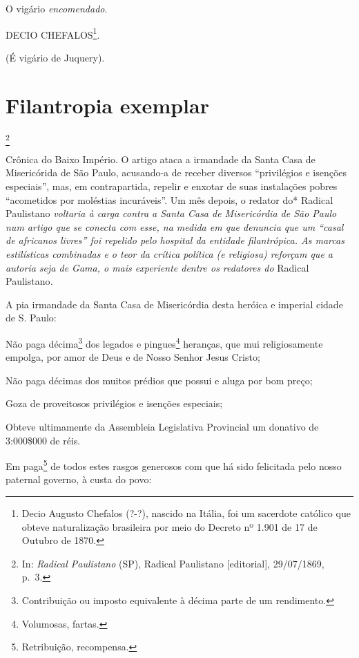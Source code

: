 O vigário \emph{encomendado}.

DECIO CHEFALOS\footnote{Decio Augusto Chefalos (?-?), nascido na
  Itália, foi um sacerdote católico que obteve naturalização brasileira
  por meio do Decreto nº 1.901 de 17 de Outubro de 1870.}.

(É vigário de Juquery).

\chapter{Filantropia exemplar}\footnote{In: \emph{Radical Paulistano} (SP),
  Radical Paulistano {[}editorial{]}, 29/07/1869, p.~3.}

\begin{didascalia}
Crônica do Baixo Império. O artigo ataca a irmandade da Santa Casa de
Misericórida de São Paulo, acusando-a de receber diversos ``privilégios e
isenções especiais'', mas, em contrapartida, repelir e enxotar de suas
instalações pobres ``acometidos por moléstias incuráveis''. Um mês depois,
o redator do* Radical Paulistano \emph{voltaria à carga contra a Santa
Casa de Misericórdia de São Paulo num artigo que se conecta com esse, na
medida em que denuncia que um ``casal de africanos livres'' foi repelido
pelo hospital da entidade filantrópica. As marcas estilísticas
combinadas e o teor da crítica política (e religiosa) reforçam que a
autoria seja de Gama, o mais experiente dentre os redatores do} Radical
Paulistano\emph{.}
\end{didascalia}

\asterisc{}

A pia irmandade da Santa Casa de Misericórdia desta heróica e imperial
cidade de S. Paulo:

Não paga décima\footnote{Contribuição ou imposto equivalente à décima
  parte de um rendimento.} dos legados e pingues\footnote{Volumosas,
  fartas.} heranças, que mui religiosamente empolga, por amor de Deus e
de Nosso Senhor Jesus Cristo;

Não paga décimas dos muitos prédios que possui e aluga por bom preço;

Goza de proveitosos privilégios e isenções especiais;

Obteve ultimamente da Assembleia Legislativa Provincial um donativo de
3:000\$000 de réis.

Em paga\footnote{Retribuição, recompensa.} de todos estes rasgos
generosos com que há sido felicitada pelo nosso paternal governo, à
custa do povo:

